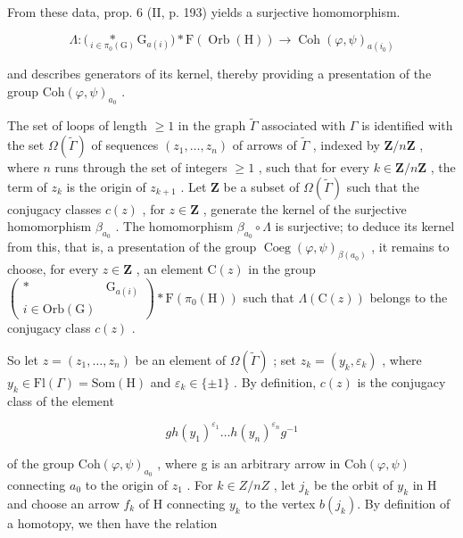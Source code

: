 From these data, prop. 6 (II, p. 193) yields a surjective homomorphism.

\[
\Lambda \colon \bigl (\underset {i \in \pi_ {0} (\mathrm{G})} {*} \mathrm{G} _ {a (i)} \bigr) * \mathrm{F} (\operatorname{Orb} (\mathrm{H})) \to \operatorname{Coh} (\varphi , \psi) _ {a (i _ {0})}
\]

and describes generators of its kernel, thereby providing a presentation of the group \(\mathrm{Coh}(\varphi,\psi)_{a_{0}}\) .

The set of loops of length \(\geqslant 1\) in the graph \(\widetilde{\Gamma}\) associated with \(\Gamma\) is identified with the set \(\Omega(\widetilde{\Gamma})\) of sequences \((z_1, \ldots, z_n)\) of arrows of \(\widetilde{\Gamma}\) , indexed by \(\mathbf{Z}/n\mathbf{Z}\) , where \(n\) runs through the set of integers \(\geqslant 1\) , such that for every \(k \in \mathbf{Z}/n\mathbf{Z}\) , the term of \(z_k\) is the origin of \(z_{k+1}\) . Let \(\mathbf{Z}\) be a subset of \(\Omega(\widetilde{\Gamma})\) such that the conjugacy classes \(c(z)\) , for \(z \in \mathbf{Z}\) , generate the kernel of the surjective homomorphism \(\beta_{a_0}\) . The homomorphism \(\beta_{a_0} \circ \Lambda\) is surjective; to deduce its kernel from this, that is, a presentation of the group \(\operatorname{Coeg}(\varphi, \psi)_{\beta(a_0)}\) , it remains to choose, for every \(z \in \mathbf{Z}\) , an element \(\mathrm{C}(z)\) in the group \(\left( \begin{array}{cc} * & \mathrm{G}_{a(i)} \\ i \in \mathrm{Orb}(\mathrm{G}) & \end{array} \right) * \mathrm{F}(\pi_0(\mathrm{H}))\) such that \(\Lambda(\mathrm{C}(z))\) belongs to the conjugacy class \(c(z)\) .

So let \(z = (z_{1}, \ldots, z_{n})\) be an element of \(\Omega(\tilde{\Gamma})\) ; set \(z_{k} = (y_{k}, \varepsilon_{k})\) , where \(y_{k} \in \mathrm{Fl}(\Gamma) = \mathrm{Som}(\mathrm{H})\) and \(\varepsilon_{k} \in \{\pm 1\}\) . By definition, \(c(z)\) is the conjugacy class of the element

\[
g h (y _ {1}) ^ {\varepsilon_ {1}} \dots h (y _ {n}) ^ {\varepsilon_ {n}} g ^ {- 1}
\]

of the group \(\mathrm{Coh}(\varphi,\psi)_{a_{0}}\) , where g is an arbitrary arrow in \(\mathrm{Coh}(\varphi,\psi)\) connecting \(a_{0}\) to the origin of \(z_{1}\) . For \(k \in Z/nZ\) , let \(j_{k}\) be the orbit of \(y_{k}\) in H and choose an arrow \(f_{k}\) of H connecting \(y_{k}\) to the vertex \(b(j_{k})\). By definition of a homotopy, we then have the relation

